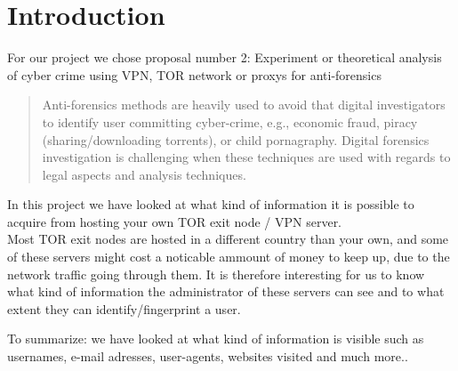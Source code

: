 \section{Introduction}
For our project we chose proposal number 2: Experiment or theoretical analysis of cyber crime using VPN, TOR network or proxys for anti-forensics

\begin{quote}
Anti-forensics methods are heavily used to avoid that digital investigators to identify user committing cyber-crime, e.g., economic fraud, piracy (sharing/downloading torrents), or child pornagraphy. Digital forensics investigation is challenging when these techniques are used with regards to legal aspects and analysis techniques.
\end{quote}


In this project we have looked at what kind of information it is possible to acquire from hosting your own TOR exit node / VPN server. \\

Most TOR exit nodes are hosted in a different country than your own, and some of these servers might cost a noticable ammount of money to keep up, due to the network traffic going through them. It is therefore interesting for us to know what kind of information the administrator of these servers can see and to what extent they can identify/fingerprint a user.

To summarize:
we have looked at what kind of information is visible such as usernames, e-mail adresses, user-agents, websites visited and much more..
